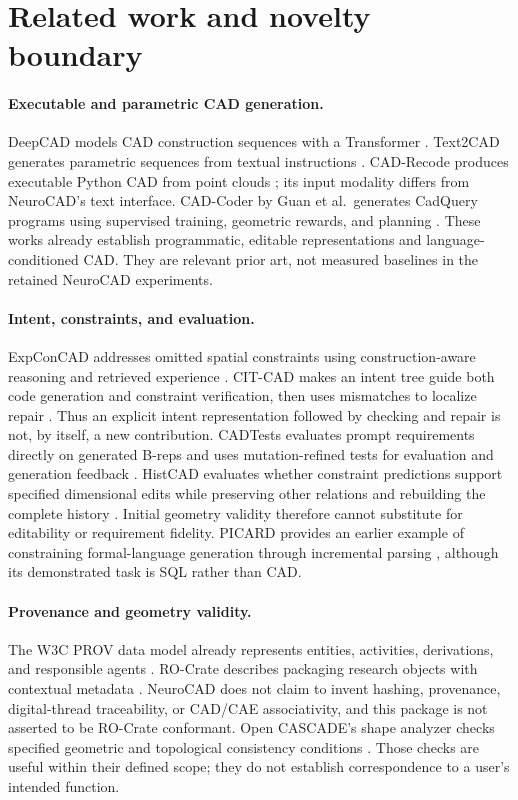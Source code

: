 \documentclass[10pt]{article}
\begin{document}
\section{Related work and novelty boundary}

\paragraph{Executable and parametric CAD generation.}
DeepCAD models CAD construction sequences with a Transformer
\citep{wu2021deepcad}. Text2CAD generates parametric sequences from textual
instructions \citep{khan2024text2cad}. CAD-Recode produces executable Python
CAD from point clouds \citep{rukhovich2025cadrecode}; its input modality differs
from NeuroCAD's text interface. CAD-Coder by Guan et al.\ generates CadQuery
programs using supervised training, geometric rewards, and planning
\citep{guan2025cadcoder}. These works already establish programmatic,
editable representations and language-conditioned CAD. They are relevant
prior art, not measured baselines in the retained NeuroCAD experiments.

\paragraph{Intent, constraints, and evaluation.}
ExpConCAD addresses omitted spatial constraints using construction-aware
reasoning and retrieved experience \citep{liu2026expconcad}. CIT-CAD makes an
intent tree guide both code generation and constraint verification, then uses
mismatches to localize repair \citep{du2026citcad}. Thus an explicit intent
representation followed by checking and repair is not, by itself, a new
contribution. CADTests evaluates prompt requirements directly on generated
B-reps and uses mutation-refined tests for evaluation and generation feedback
\citep{mallis2026cadtests}. HistCAD evaluates whether constraint predictions
support specified dimensional edits while preserving other relations and
rebuilding the complete history \citep{dong2026histcad}. Initial geometry
validity therefore cannot substitute for editability or requirement fidelity.
PICARD provides an earlier example of constraining formal-language generation
through incremental parsing \citep{scholak2021picard}, although its demonstrated
task is SQL rather than CAD.

\paragraph{Provenance and geometry validity.}
The W3C PROV data model already represents entities, activities, derivations,
and responsible agents \citep{moreau2013prov}. RO-Crate describes packaging
research objects with contextual metadata \citep{rocrate2025}. NeuroCAD does
not claim to invent hashing, provenance, digital-thread traceability, or CAD/CAE
associativity, and this package is not asserted to be RO-Crate conformant.
Open CASCADE's shape analyzer checks specified geometric and topological
consistency conditions \citep{occt2026}. Those checks are useful within their
defined scope; they do not establish correspondence to a user's intended
function.
\end{document}
